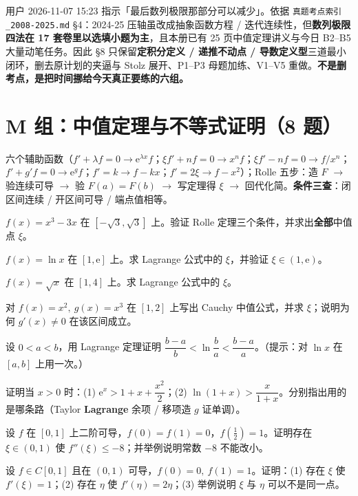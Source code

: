\documentclass[11pt,a4paper]{ctexart}
\newcommand{\ee}{\mathrm{e}}
\begin{document}
\begin{warnbox}[为什么数列极限只留 3 题]
用户 2026-11-07 15:23 指示「最后数列极限那部分可以减少」。依据 \texttt{真题考点索引\_2008-2025.md} \S 4：2024-25 压轴虽改成抽象函数方程 / 迭代连续性，但\textbf{数列极限四法在 17 套卷里以选填小题为主}，且本册已有 25 页中值定理讲义与今日 B2--B5 大量动笔任务。因此 \S 8 只保留\textbf{定积分定义 / 递推不动点 / 导数定义型}三道最小闭环，删去原计划的夹逼与 Stolz 展开、P1--P3 母题加练、V1--V5 重做。\textbf{不是删考点，是把时间挪给今天真正要练的六组。}
\end{warnbox}

\section{M 组：中值定理与不等式证明（8 题）}

\begin{methodbox}[动笔前先默写]
六个辅助函数（$f'+\lambda f=0\to\ee^{\lambda x}f$；$\xi f'+nf=0\to x^nf$；$\xi f'-nf=0\to f/x^n$；$f'+g'f=0\to\ee^gf$；$f'=k\to f-kx$；$f'=2\xi\to f-x^2$）；Rolle 五步：造 $F$ $\to$ 验连续可导 $\to$ 验 $F(a)=F(b)$ $\to$ 写定理得 $\xi$ $\to$ 回代化简。\textbf{条件三查}：闭区间连续 / 开区间可导 / 端点值相等。
\end{methodbox}

\begin{qlist}
\item $f(x)=x^3-3x$ 在 $[-\sqrt3,\sqrt3]$ 上。验证 Rolle 定理三个条件，并求出\textbf{全部}中值点 $\xi$。
\item $f(x)=\ln x$ 在 $[1,\ee]$ 上。求 Lagrange 公式中的 $\xi$，并验证 $\xi\in(1,\ee)$。
\item $f(x)=\sqrt x$ 在 $[1,4]$ 上。求 Lagrange 公式中的 $\xi$。
\item 对 $f(x)=x^2,\ g(x)=x^3$ 在 $[1,2]$ 上写出 Cauchy 中值公式，并求 $\xi$；说明为何 $g'(x)\ne0$ 在该区间成立。
\item 设 $0<a<b$，用 Lagrange 定理证明 $\dfrac{b-a}{b}<\ln\dfrac ba<\dfrac{b-a}{a}$。（提示：对 $\ln x$ 在 $[a,b]$ 上用一次。）
\item 证明当 $x>0$ 时：(1) $\ee^x>1+x+\dfrac{x^2}{2}$；(2) $\ln(1+x)>\dfrac{x}{1+x}$。分别指出用的是哪条路（Taylor \textbf{Lagrange} 余项 / 移项造 $g$ 证单调）。
\item 设 $f$ 在 $[0,1]$ 上二阶可导，$f(0)=f(1)=0$，$f\!\left(\frac12\right)=1$。证明存在 $\xi\in(0,1)$ 使 $f''(\xi)\leq-8$；并举例说明常数 $-8$ 不能改小。
\item 设 $f\in C[0,1]$ 且在 $(0,1)$ 可导，$f(0)=0,\ f(1)=1$。证明：(1) 存在 $\xi$ 使 $f'(\xi)=1$；(2) 存在 $\eta$ 使 $f'(\eta)=2\eta$；(3) 举例说明 $\xi$ 与 $\eta$ 可以不是同一点。
\end{qlist}
\end{document}
